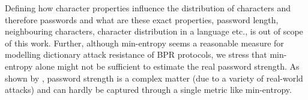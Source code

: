 
\begin{remark}
Defining how character properties influence the distribution \DD of characters and therefore passwords and what are these exact properties, \eg password length, neighbouring characters, character distribution in a language etc., is out of scope of this work.
Further, although min-entropy seems a reasonable measure for modelling dictionary attack resistance of \ac{BPR} protocols,
we stress that min-entropy alone might not be sufficient to estimate the real password strength. 
As shown by \citet{MazurekKVBCCKSU13}, password strength is a complex matter (due to a variety of real-world attacks) and can hardly be captured through a single metric like min-entropy.
\end{remark}

